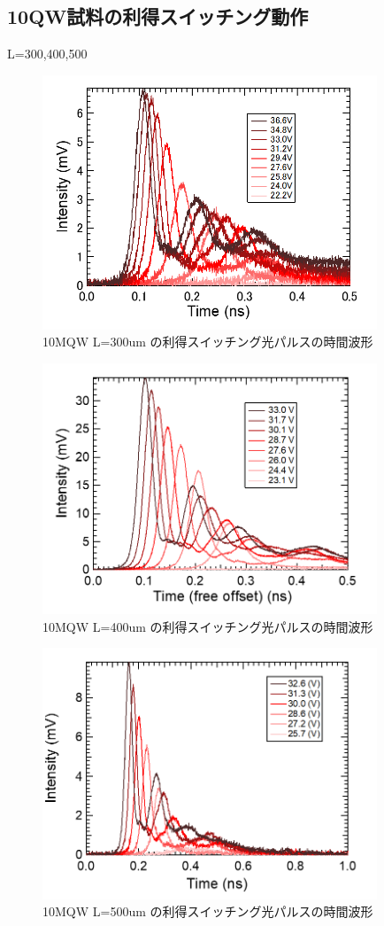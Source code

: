\subsection{10QW試料の利得スイッチング動作}%
L=300,400,500
\begin{figure}[h]
	\centering
	\includegraphics[width=10cm]{figure/fig_3_2_10QW_ridge_L300_GS.png}
		\caption{10MQW L=300um の利得スイッチング光パルスの時間波形}
		\label{fig:fig_3_2_10QW_ridge_L400_GS}
\end{figure}

\begin{figure}[h]
	\centering
	\includegraphics[width=10cm]{figure/fig_3_2_10QW_ridge_L400_GS.png}
		\caption{10MQW L=400um の利得スイッチング光パルスの時間波形}
		\label{fig:fig_3_2_10QW_ridge_L400_GS}
\end{figure}
\begin{figure}[h]
	\centering
	\includegraphics[width=10cm]{figure/fig_3_2_10QW_ridge_L500_GS.png}
		\caption{10MQW L=500um の利得スイッチング光パルスの時間波形}
		\label{fig:fig_3_2_10QW_ridge_L500_GS}
\end{figure}
\clearpage
